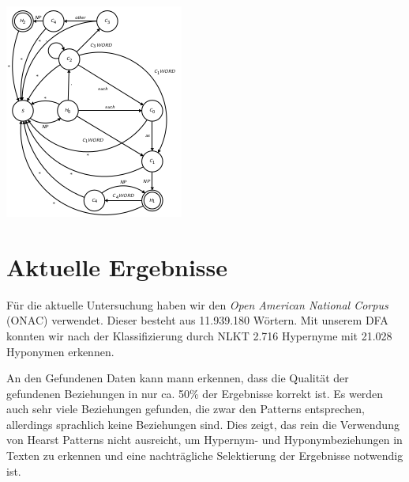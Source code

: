 \begin{centering}
  \includegraphics[scale=0.75]{img/hpdfa}
\end{centering}

\section{Aktuelle Ergebnisse}

Für die aktuelle Untersuchung haben wir den \textit{Open American
National Corpus} (ONAC) verwendet. Dieser besteht aus 11.939.180 
Wörtern. Mit unserem DFA konnten wir nach der Klassifizierung durch
NLKT 2.716 Hypernyme mit 21.028 Hyponymen erkennen.

An den Gefundenen Daten kann mann erkennen, dass die Qualität der
gefundenen Beziehungen in nur ca. 50\% der Ergebnisse korrekt ist. Es
werden auch sehr viele Beziehungen gefunden, die zwar den Patterns
entsprechen, allerdings sprachlich keine Beziehungen sind. Dies zeigt,
das rein die Verwendung von Hearst Patterns nicht ausreicht, um
Hypernym- und Hyponymbeziehungen in Texten zu erkennen und eine
nachträgliche Selektierung der Ergebnisse notwendig ist.
